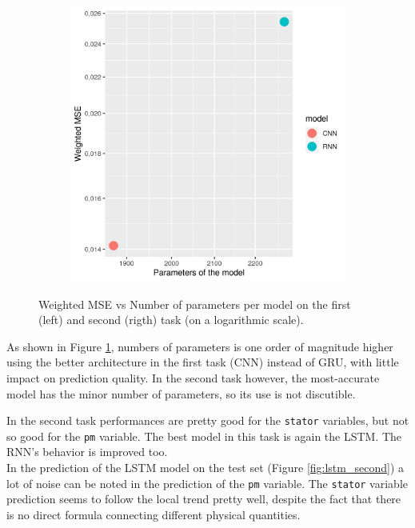 \begin{figure}[!h]
  \begin{subfigure}[b]{0.4\linewidth} \includegraphics[width=\linewidth]{imgs/performance_parameters_Weighted_MSE2.png}
  \end{subfigure}
    \caption{Weighted MSE vs Number of parameters per model on the first (left) and second (rigth) task (on a logarithmic scale).}
    \label{fig:banana}
\end{figure}
  
As shown in Figure \ref{fig:banana}, numbers of parameters is one order of magnitude higher using the better architecture in the first task (CNN) instead of GRU, with little impact on prediction quality.
In the second task however, the most-accurate model has the minor number of parameters, so its use is not discutible. \newline

In the second task performances are pretty good for the \verb|stator| variables, but not so good for the \verb|pm| variable. The best model in this task is again the LSTM. The RNN's behavior is improved too.\\
In the prediction of the LSTM model on the test set (Figure \ref{fig:lstm_second}) a lot of noise can be noted in the prediction of the \verb|pm| variable.
The \verb|stator| variable prediction seems to follow the local trend pretty well, despite the fact that there is no direct formula connecting different physical quantities.

